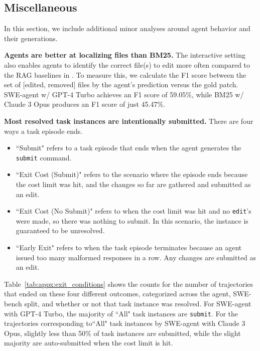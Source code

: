 \subsection{Miscellaneous}
\label{appx:analyses:miscellaneous}
In this section, we include additional minor analyses around agent behavior and their generations.

\textbf{Agents are better at localizing files than BM25.}
The interactive setting also enables agents to identify the correct file(s) to edit more often compared to the RAG baselines in \citet{jimenez2024swebench}.
To measure this, we calculate the F1 score between the set of [edited, removed] files by the agent's prediction versus the gold patch.
SWE-agent w/ GPT-4 Turbo achieves an F1 score of \num{59.05}\%, while BM25 w/ Claude 3 Opus produces an F1 score of just \num{45.47}\%.

\textbf{Most resolved task instances are intentionally submitted.} There are four ways a task episode ends. 
\begin{itemize}
    \item ``Submit" refers to a task episode that ends when the agent generates the \texttt{submit} command.
    \item ``Exit Cost (Submit)" refers to the scenario where the episode ends because the cost limit was hit, and the changes so far are gathered and submitted as an edit.
    \item ``Exit Cost (No Submit)" refers to when the cost limit was hit and no \texttt{edit}'s were made, so there was nothing to submit. In this scenario, the instance is guaranteed to be unresolved.
    \item ``Early Exit" refers to when the task episode terminates because an agent issued too many malformed responses in a row. Any changes are submitted as an edit.
\end{itemize}

Table~\ref{tab:appx:exit_conditions} shows the counts for the number of trajectories that ended on these four different outcomes, categorized across the agent, SWE-bench split, and whether or not that task instance was resolved.
For SWE-agent with GPT-4 Turbo, the majority of ``All" task instances are \texttt{submit}.
For the trajectories corresponding to``All" task instances by SWE-agent with Claude 3 Opus, slightly less than \num{50}\% of task instances are submitted, while the slight majority are auto-submitted when the cost limit is hit.



